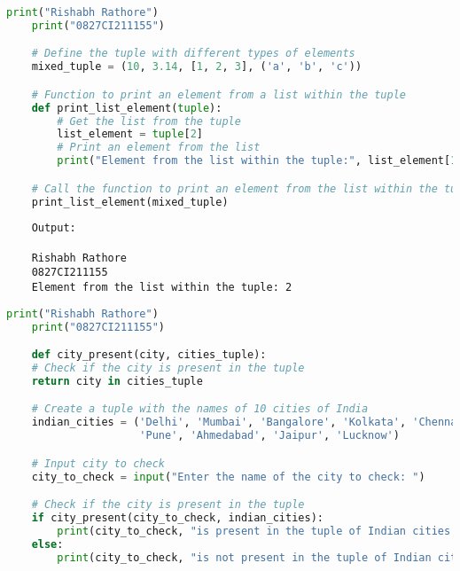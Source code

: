 \documentclass{report}
\begin{document}
\newpage


\sol 
\begin{lstlisting}[language=Python]
	print("Rishabh Rathore")
	print("0827CI211155")

	# Define the tuple with different types of elements
	mixed_tuple = (10, 3.14, [1, 2, 3], ('a', 'b', 'c'))

	# Function to print an element from a list within the tuple
	def print_list_element(tuple):
		# Get the list from the tuple
		list_element = tuple[2]
		# Print an element from the list
		print("Element from the list within the tuple:", list_element[1])

	# Call the function to print an element from the list within the tuple
	print_list_element(mixed_tuple)

\end{lstlisting}

\begin{verbatim}
	Output:

	Rishabh Rathore
	0827CI211155
	Element from the list within the tuple: 2

\end{verbatim}



\newpage


\sol 
\begin{lstlisting}[language=Python]
	print("Rishabh Rathore")
	print("0827CI211155")

	def city_present(city, cities_tuple):
    # Check if the city is present in the tuple
    return city in cities_tuple

	# Create a tuple with the names of 10 cities of India
	indian_cities = ('Delhi', 'Mumbai', 'Bangalore', 'Kolkata', 'Chennai', 'Hyderabad',
					 'Pune', 'Ahmedabad', 'Jaipur', 'Lucknow')

	# Input city to check
	city_to_check = input("Enter the name of the city to check: ")

	# Check if the city is present in the tuple
	if city_present(city_to_check, indian_cities):
		print(city_to_check, "is present in the tuple of Indian cities.")
	else:
		print(city_to_check, "is not present in the tuple of Indian cities.")
\end{lstlisting}
\end{document}
